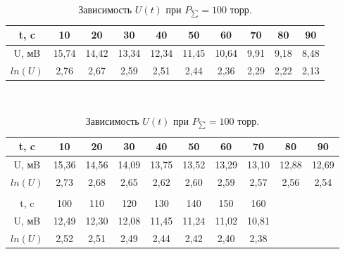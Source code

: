 \documentclass[a4paper,11.5pt]{article} %
\begin{document}
\begin{table}[h]
	\caption{Зависимость $U(t)$ при $P_{\sum} = 35 $ торр.}
\begin{tabular}{| c | c | c | c | c | c | c | c | c | c |}
\hline
t, c & 10 & 20 & 30 & 40 & 50 & 60 & 70 & 80 & 90 \\ \hline
U, мB & 15,74 & 14,42 & 13,34 & 12,34 & 11,45 & 10,64 & 9,91 & 9,18 & 8,48 \\ \hline
$ln(U)$ & 2,76 & 2,67 & 2,59 & 2,51 & 2,44 & 2,36 & 2,29 & 2,22 & 2,13 \\ \hline
\end{tabular}\\

	\caption{Зависимость $U(t)$ при $P_{\sum} = 100 $ торр.}
\begin{tabular}{| c | c | c | c | c | c | c | c | c | c |}
\hline
t, c & 10 & 20 & 30 & 40 & 50 & 60 & 70 & 80 & 90  \\ \hline
U, мB & 15,36 & 14,56 & 14,09 & 13,75 & 13,52 & 13,29 & 13,10 & 12,88 & 12,69  \\ \hline
$ln(U)$ & 2,73 & 2,68 & 2,65 & 2,62 & 2,60 & 2,59 & 2,57 & 2,56 & 2,54  \\ \hline
\\  \hline
t, c & 100 & 110 & 120 & 130 & 140 & 150 & 160 &&  \\ \hline
U, мB & 12,49 & 12,30 & 12,08 & 11,45 & 11,24 & 11,02 & 10,81 && \\ \hline
$ln(U)$ & 2,52 & 2,51 & 2,49 & 2,44 & 2,42 & 2,40 & 2,38 && \\ \hline
\end{tabular}\\
\end{table}
\end{document}
